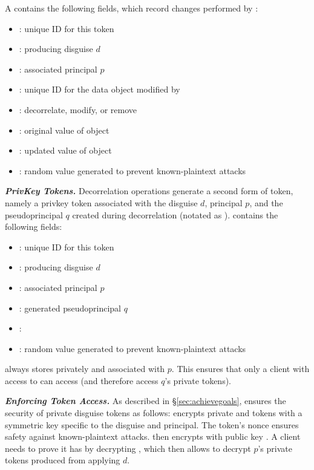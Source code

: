 A  contains the following fields, which record changes performed by :
\begin{itemize}
\item {}: unique ID for this token
\item {}: producing disguise $d$ 
\item {}: associated principal $p$
\item {}: unique ID for the data object modified by 
\item {}: decorrelate, modify, or remove
\item {}: original value of object 
\item {}: updated value of object 
\item {}: random value generated to prevent known-plaintext attacks
\end{itemize}

\noindent\textbf{\emph{PrivKey Tokens.}}
Decorrelation operations generate a second form of token, namely a privkey token associated with the disguise $d$, principal $p$, and the pseudoprincipal $q$ created
during decorrelation (notated as ).
 contains the following fields:
\begin{itemize}
\item {}: unique ID for this token
\item {}: producing disguise $d$ 
\item {}: associated principal $p$
\item {}: generated pseudoprincipal $q$
\item {}: 
\item {}: random value generated to prevent known-plaintext attacks
\end{itemize}
\sys always stores  privately and associated with $p$. This ensures that only a client
with access to  can access  (and therefore access $q$'s private tokens).

\vspace{12pt}
\noindent\textbf{\emph{Enforcing Token Access.}}
As described in \S\ref{sec:achievegoals}, \sys ensures the security of private disguise tokens as
follows: \sys encrypts private  and  tokens with a symmetric key  specific to
the disguise and principal. The token's nonce ensures safety against
known-plaintext attacks. \sys then encrypts  with public key .
A client needs to prove it has  by decrypting , %
which then allows \sys to decrypt $p$'s private tokens produced from applying $d$.

